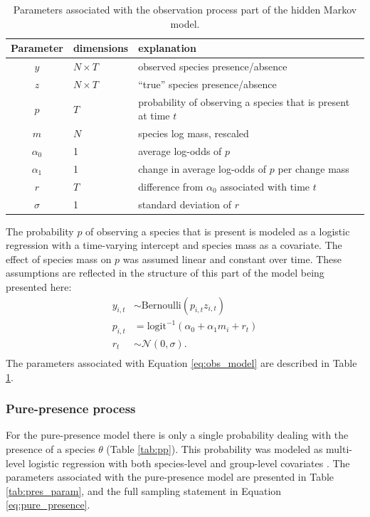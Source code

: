 \begin{table}
  \centering
  \caption{Parameters associated with the observation process part of the hidden Markov model.}
  \begin{tabular}{c l l}
    Parameter & dimensions & explanation \\
    \hline
    \(y\) & \(N \times T\) & observed species presence/absence \\
    \(z\) & \(N \times T\) & ``true'' species presence/absence \\
    \(p\) & \(T\) & probability of observing a species that is present at time \(t\) \\
    \(m\) & \(N\) & species log mass, rescaled \\
    \(\alpha_{0}\) & 1 & average log-odds of \(p\) \\ %
    \(\alpha_{1}\) & 1 & change in average log-odds of \(p\) per change mass \\
    \(r\) & \(T\) & difference from \(\alpha_{0}\) associated with time \(t\) \\
    \(\sigma\) & 1 & standard deviation of \(r\) \\
  \end{tabular}
  \label{tab:obs_param}
\end{table}

The probability \(p\) of observing a species that is present is modeled as a logistic regression with a time-varying intercept and species mass as a covariate. The effect of species mass on \(p\) was assumed linear and constant over time. These assumptions are reflected in the structure of this part of the model being presented here: 
\begin{equation}
  \begin{aligned}
    y_{i, t} &\sim \text{Bernoulli}(p_{i, t} z_{i, t}) \\
    p_{i, t} &= \text{logit}^{-1}(\alpha_{0} + \alpha_{1} m_{i} + r_{t}) \\ 
    r_{t} &\sim \mathcal{N}(0, \sigma). \\
  \end{aligned}
  \label{eq:obs_model}
\end{equation}
The parameters associated with Equation \ref{eq:obs_model} are described in Table \ref{tab:obs_param}.


\subsubsection*{Pure-presence process}
For the pure-presence model there is only a single probability dealing with the presence of a species \(\theta\) (Table \ref{tab:pp}). This probability was modeled as multi-level logistic regression with both species-level and group-level covariates \citep{Gelman2007,Gelman2013d}. The parameters associated with the pure-presence model are presented in Table \ref{tab:pres_param}, and the full sampling statement in Equation \ref{eq:pure_presence}.

